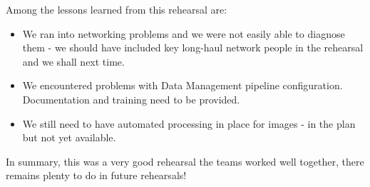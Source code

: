 Among the lessons learned from this rehearsal are:
\begin{itemize}
\item We ran into networking problems and we were not easily able to diagnose them - we should have included key 
long-haul network people in the rehearsal and we shall next time.

\item We encountered problems with Data Management pipeline configuration. Documentation and training need to be provided.

\item We still need to have automated processing in place for images - in the plan but not yet available.
\end{itemize}

In summary, this was a very good rehearsal the teams worked well together, there remains plenty to do in future rehearsals!





